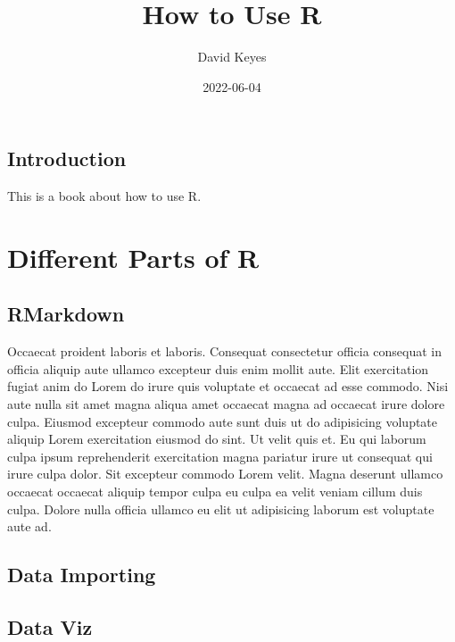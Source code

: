 \documentclass[
]{book}
\title{How to Use R}
\author{David Keyes}
\date{2022-06-04}
\begin{document}
\maketitle

{
\setcounter{tocdepth}{1}
\tableofcontents
}
\hypertarget{introduction}{%
\chapter*{Introduction}\label{introduction}}

This is a book about how to use R.

\hypertarget{part-different-parts-of-r}{%
\part*{Different Parts of R}\label{part-different-parts-of-r}}

\hypertarget{rmarkdown}{%
\chapter*{RMarkdown}\label{rmarkdown}}

Occaecat proident laboris et laboris. Consequat consectetur officia consequat in officia aliquip aute ullamco excepteur duis enim mollit aute. Elit exercitation fugiat anim do Lorem do irure quis voluptate et occaecat ad esse commodo. Nisi aute nulla sit amet magna aliqua amet occaecat magna ad occaecat irure dolore culpa. Eiusmod excepteur commodo aute sunt duis ut do adipisicing voluptate aliquip Lorem exercitation eiusmod do sint. Ut velit quis et. Eu qui laborum culpa ipsum reprehenderit exercitation magna pariatur irure ut consequat qui irure culpa dolor. Sit excepteur commodo Lorem velit. Magna deserunt ullamco occaecat occaecat aliquip tempor culpa eu culpa ea velit veniam cillum duis culpa. Dolore nulla officia ullamco eu elit ut adipisicing laborum est voluptate aute ad.

\hypertarget{data-importing}{%
\chapter*{Data Importing}\label{data-importing}}

\hypertarget{data-viz}{%
\chapter*{Data Viz}\label{data-viz}}
\end{document}
